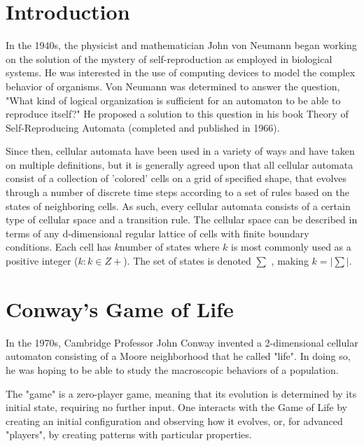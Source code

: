 \documentclass{report}
\begin{document}
\chapter{Introduction}
In the 1940s, the physicist and mathematician John von Neumann began working
on the solution of the mystery of self-reproduction as employed in biological systems. He was
interested in the use of computing devices to model the complex behavior of organisms.
Von Neumann was determined to answer the question, "What kind of logical organization is sufficient for
an automaton to be able to reproduce itself?" He proposed a solution to this question in
his book Theory of Self-Reproducing Automata (completed and published in 1966).

\noindent Since then, cellular automata have been used in a variety of ways and have taken on multiple
definitions, but it is generally agreed upon that all cellular automata consist of a collection of
'colored' cells on a grid of specified shape, that evolves through a number of discrete time steps
according to a set of rules based on the states of neighboring cells. As such, every cellular
automata consists of a certain type of cellular space and a transition rule. The cellular space can
be described in terms of any d-dimensional regular lattice of cells with finite boundary conditions.
Each cell has $k $number of states where $k$ is most commonly used as a positive integer ($k : k \in Z+$). The set of states is denoted $\sum$ , making $k = |\sum|$. 

\chapter{Conway's Game of Life}

In the 1970s, Cambridge Professor John Conway invented a 2-dimensional cellular automaton consisting of a Moore neighborhood that he called "life". In doing so, he was hoping to be able to study the macroscopic behaviors of a population.

\noindent The "game" is a zero-player game, meaning that its evolution is determined by its initial state, requiring no further input. One interacts with the Game of Life by creating an initial configuration and observing how it evolves, or, for advanced "players", by creating patterns with particular properties.
\end{document}
